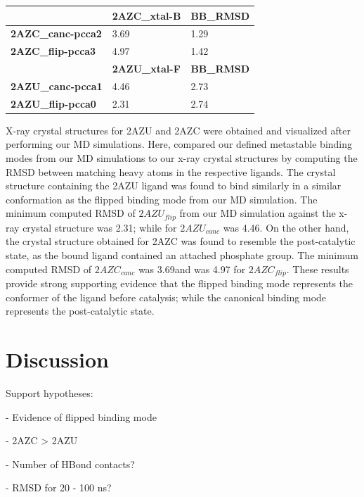 \documentclass[fleqn,10pt]{wlscirep}
\newcommand{\angstrom}{\text{\normalfont\AA}}
\begin{document}
\begin{table}[!ht]
\begin{tabular}{|l|l|l|}
\hline
                          & \textbf{2AZC\_xtal-B} & \textbf{BB\_RMSD} \\ \hline
\textbf{2AZC\_canc-pcca2} & 3.69                  & 1.29             \\ \hline
\textbf{2AZC\_flip-pcca3} & 4.97                  & 1.42              \\ \hline
\textbf{}                 & \textbf{2AZU\_xtal-F} & \textbf{BB\_RMSD} \\ \hline
\textbf{2AZU\_canc-pcca1} & 4.46                  & 2.73             \\ \hline
\textbf{2AZU\_flip-pcca0} & 2.31                  & 2.74              \\ \hline
\end{tabular}
\end{table}

X-ray crystal structures for 2AZU and 2AZC were obtained and visualized after performing our MD simulations.
Here, compared our defined metastable binding modes from our MD simulations to our x-ray crystal structures by computing the RMSD between matching heavy atoms in the respective ligands.
The crystal structure containing the 2AZU ligand was found to bind similarly in a similar conformation as the flipped binding mode from our MD simulation.
The minimum computed RMSD of $2AZU_{flip}$ from our MD simulation against the x-ray crystal structure was 2.31\angstrom; while for $2AZU_{canc}$ was 4.46\angstrom.
On the other hand, the crystal structure obtained for 2AZC was found to resemble the post-catalytic state, as the bound ligand contained an attached phosphate group.
The minimum computed RMSD of $2AZC_{canc}$ was 3.69\angstrom and was 4.97 for $2AZC_{flip}$.
These results provide strong supporting evidence that the flipped binding mode represents the conformer of the ligand before catalysis; while the canonical binding mode represents the post-catalytic state.

\section{Discussion}
Support hypotheses:

  - Evidence of flipped binding mode
  
  - 2AZC > 2AZU
  
     - Number of HBond contacts?
     
     - RMSD for 20 - 100 ns?
\end{document}
